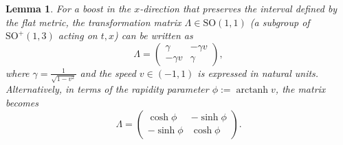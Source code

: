 \documentclass{amsart}
\newtheorem{lemma}[theorem]{Lemma}
\theoremstyle{definition}
\theoremstyle{remark}
\DeclareMathOperator{\arctanh}{arctanh}
\begin{document}
\begin{lemma}\label{lem:boost_x_direction_so11}
  For a boost in the $x$-direction that preserves the interval defined by the flat metric, the transformation matrix $\Lambda\in\mathrm{SO}(1,1)$ (a subgroup of $\mathrm{SO}^+(1,3)$ acting on $t,x$) can be written as
  \begin{equation*}
    \Lambda =
    \begin{pmatrix}
      \gamma & -\gamma v \\
      -\gamma v & \gamma
    \end{pmatrix},
  \end{equation*}
  where $\gamma = \frac{1}{\sqrt{1 - v^2}}$ and the \emph{speed} $v \in (-1,1)$ is expressed in natural units. Alternatively, in terms of the \emph{rapidity} parameter $\phi := \arctanh v$, the matrix becomes
  \begin{equation*}
    \Lambda =
    \begin{pmatrix}
      \cosh \phi & -\sinh \phi \\
      -\sinh \phi & \cosh \phi
    \end{pmatrix}.
  \end{equation*}
\end{lemma}
\end{document}
